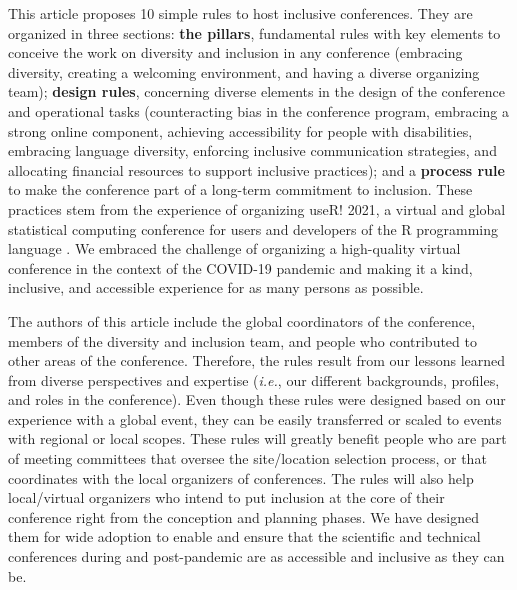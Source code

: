 \documentclass[10pt,letterpaper]{article}
\begin{document}
This article proposes 10 simple rules to host inclusive conferences.
They are organized in three sections: \textbf{the pillars}, fundamental rules with key elements to conceive the work on diversity and inclusion in any conference (embracing diversity, creating a welcoming environment, and having a diverse organizing team); \textbf{design rules}, concerning diverse elements in the design of the conference and operational tasks (counteracting bias in the conference program, embracing a strong online component, achieving accessibility for people with disabilities, embracing language diversity, enforcing inclusive communication strategies, and allocating financial resources to support inclusive practices); and a \textbf{process rule} to make the conference part of a long-term commitment to inclusion. 
These practices stem from the experience of organizing useR! 2021, a virtual and global statistical computing conference for users and developers of the R programming language \cite{r_core_team_2021}. 
We embraced the challenge of organizing a high-quality virtual conference in the context of the COVID-19 pandemic and making it a kind, inclusive, and accessible experience for as many persons as possible.

The authors of this article include the global coordinators of the conference, members of the diversity and inclusion team, and people who contributed to other areas of the conference. 
Therefore, the rules result from our lessons learned from diverse perspectives and expertise (\textit{i.e.}, our different backgrounds, profiles, and roles in the conference). 
Even though these rules were designed based on our experience with a global event, they can be easily transferred or scaled to events with regional or local scopes.
These rules will greatly benefit people who are part of meeting committees that oversee the site/location selection process, or that coordinates with the local organizers of conferences.
The rules will also help local/virtual organizers who intend to put inclusion at the core of their conference right from the conception and planning phases. We have designed them for wide adoption to enable and ensure that the scientific and technical conferences during and post-pandemic are as accessible and inclusive as they can be. 
\end{document}
